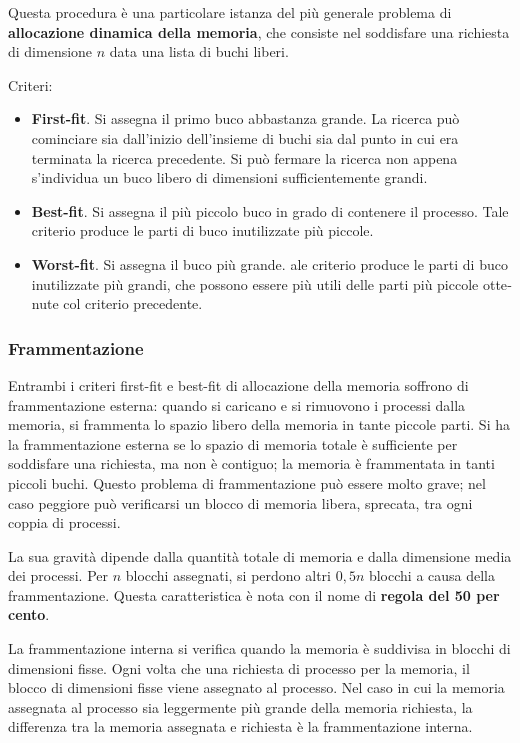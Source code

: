 \documentclass[11pt,a4paper]{article}
\begin{document}
Questa procedura è una particolare istanza del più generale problema di \textbf{allocazione
dinamica della memoria}, che consiste nel soddisfare una richiesta di dimensione $n$ data una
lista di buchi liberi.

Criteri:
\begin{itemize}
  \item \textbf{First-fit}. Si assegna il primo buco abbastanza grande. La ricerca può cominciare sia dal­l'inizio dell'insieme di buchi sia dal punto in cui era terminata la ricerca precedente. Si può fermare la ricerca non appena s'individua un buco libero di dimensioni sufficien­temente grandi.
  \item \textbf{Best-fit}. Si assegna il più piccolo buco in grado di contenere il processo. Ta­le criterio produce le parti di buco inutilizzate più piccole.
  \item \textbf{Worst-fit}. Si assegna il buco più grande. ale criterio produce le parti di buco inutilizzate più grandi, che possono essere più utili delle parti più piccole otte­nute col criterio precedente.
\end{itemize}

\subsubsection{Frammentazione}
Entrambi i criteri first-fit e best-fit di allocazione della memoria soffrono di frammentazio­ne esterna: quando si caricano e si rimuovono i processi dalla memoria, si frammenta lo
spazio libero della memoria in tante piccole parti. Si ha la frammentazione esterna se lo spa­zio di memoria totale è sufficiente per soddisfare una richiesta, ma non è contiguo; la me­moria è frammentata in tanti piccoli buchi. Questo problema di frammentazione può esse­re molto grave; nel caso peggiore può verificarsi un blocco di memoria libera, sprecata, tra ogni coppia di processi.

La sua gravità dipende dalla quantità totale di memoria e dalla dimensione media dei
processi. Per $n$ blocchi assegnati, si perdono altri $0,5n$ blocchi a causa della frammentazione.
Questa caratteristica è nota con il nome di \textbf{regola del 50 per cento}.

La frammentazione interna si verifica quando la memoria è suddivisa in blocchi di dimensioni fisse. Ogni volta che una richiesta di processo per la memoria, il blocco di dimensioni fisse viene assegnato al processo. Nel caso in cui la memoria assegnata al processo sia leggermente più grande della memoria richiesta, la differenza tra la memoria assegnata e richiesta è la frammentazione interna.
\end{document}
